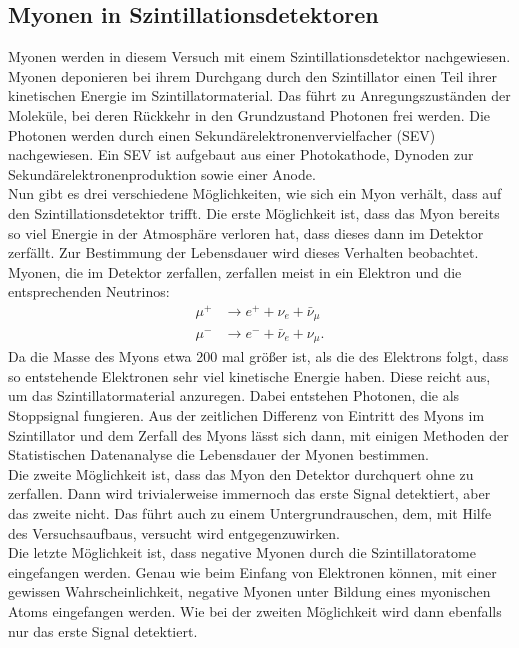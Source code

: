 \documentclass[
  bibliography=totoc,     %
  captions=tableheading,  %
  titlepage=firstiscover, %
]{scrartcl}
\begin{document}
  \subsection{Myonen in Szintillationsdetektoren}
  Myonen werden in diesem Versuch mit einem Szintillationsdetektor nachgewiesen.
  Myonen deponieren bei ihrem Durchgang durch den Szintillator einen Teil ihrer
  kinetischen Energie im Szintillatormaterial.
  Das führt zu Anregungszuständen der Moleküle, bei deren Rückkehr in
  den Grundzustand Photonen frei werden. Die Photonen werden durch einen
  Sekundärelektronenvervielfacher (SEV) nachgewiesen. Ein SEV ist aufgebaut aus
  einer Photokathode, Dynoden zur Sekundärelektronenproduktion sowie
  einer Anode.\\
  Nun gibt es drei verschiedene Möglichkeiten, wie sich ein Myon verhält, dass
  auf den Szintillationsdetektor trifft.
    Die erste Möglichkeit ist, dass das Myon bereits so viel Energie in der Atmosphäre
    verloren hat, dass dieses dann im Detektor zerfällt. Zur Bestimmung der
    Lebensdauer wird dieses Verhalten beobachtet. Myonen, die im Detektor
    zerfallen, zerfallen meist in ein Elektron und die entsprechenden Neutrinos:
    \begin{align*}
      \mu^+ &\to e^+ + \nu_{e} + \bar{\nu}_{\mu}\\
      \mu^- &\to e^- + \bar{\nu}_{e} +  \nu_{\mu}.
    \end{align*}
    Da die Masse des Myons etwa 200 mal größer ist, als die des Elektrons folgt,
    dass so entstehende Elektronen sehr viel kinetische Energie haben. Diese
    reicht aus, um das Szintillatormaterial anzuregen. Dabei entstehen Photonen,
    die als Stoppsignal fungieren. Aus der zeitlichen Differenz von Eintritt des Myons im
    Szintillator und dem Zerfall des Myons lässt sich dann, mit einigen Methoden
    der Statistischen Datenanalyse die Lebensdauer der Myonen bestimmen.\\
    Die zweite Möglichkeit ist, dass das Myon den Detektor durchquert ohne zu
    zerfallen. Dann wird trivialerweise immernoch das erste Signal detektiert,
    aber das zweite nicht. Das führt auch zu einem Untergrundrauschen, dem, mit
    Hilfe des Versuchsaufbaus, versucht wird entgegenzuwirken.\\
    Die letzte Möglichkeit ist, dass negative Myonen durch die Szintillatoratome
    eingefangen werden. Genau wie beim Einfang von Elektronen können, mit einer
    gewissen Wahrscheinlichkeit, negative Myonen unter Bildung eines myonischen
    Atoms eingefangen werden. Wie bei der zweiten Möglichkeit wird dann ebenfalls
    nur das erste Signal detektiert.
\end{document}
